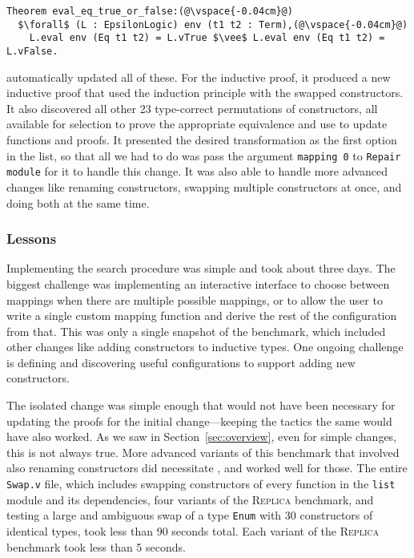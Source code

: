 \begin{lstlisting}
Theorem eval_eq_true_or_false:(@\vspace{-0.04cm}@)
  $\forall$ (L : EpsilonLogic) env (t1 t2 : Term),(@\vspace{-0.04cm}@)
    L.eval env (Eq t1 t2) = L.vTrue $\vee$ L.eval env (Eq t1 t2) = L.vFalse.
\end{lstlisting}
\toolname automatically updated all of these. For the inductive proof, it produced
a new inductive proof that used the induction principle with the swapped constructors.
It also discovered all other 23 type-correct permutations of constructors, all available for selection to 
prove the appropriate equivalence and use to update functions and proofs.
It presented the desired transformation as the first option in the list, so that all we had to do
was pass the argument \lstinline{mapping 0} to \lstinline{Repair module} for it to handle this change.
It was also able to handle more advanced changes like renaming constructors, swapping multiple constructors at once,
and doing both at the same time.

\subsubsection{Lessons}

Implementing the search procedure was simple and took about three days.
The biggest challenge was implementing an interactive interface to choose between mappings when there are multiple possible mappings,
or to allow the user to write a single custom mapping function and derive the rest of the configuration from that.
This was only a single snapshot of the benchmark, which included
other changes like adding constructors to inductive types.
One ongoing challenge is defining and discovering useful configurations to support adding new constructors.

The isolated change was simple enough that \toolname would not have been necessary
for updating the proofs for the initial change---keeping the tactics the same would have also worked.
As we saw in Section~\ref{sec:overview}, even for simple changes, this is not always true.
More advanced variants of this benchmark that involved also renaming constructors did necessitate \toolname,
and \toolname worked well for those. %
The entire \lstinline{Swap.v} file, which includes swapping constructors of every function in the \lstinline{list} module and
its dependencies, four variants of the \textsc{Replica} benchmark,
and testing a large and ambiguous swap of a type \lstinline{Enum} with 30 constructors of identical types,
took \toolname less than 90 seconds total. %
Each variant of the \textsc{Replica} benchmark took \toolname less than 5 seconds. %

